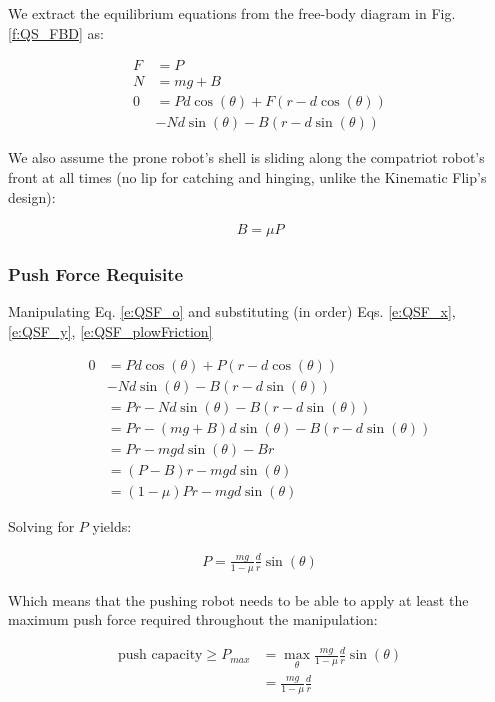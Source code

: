 \documentclass[letterpaper, 10 pt, conference]{ieeeconf}
\begin{document}
We extract the equilibrium equations from the free-body diagram in Fig. \ref{f:QS_FBD} as:

\begin{align}
  F &= P \label{e:QSF_x} \\
  N &= mg + B \label{e:QSF_y} \\
  0 &= P d \cos(\theta) + F(r - d \cos(\theta)) \\
  &   - N d \sin(\theta) - B (r - d \sin(\theta)) \label{e:QSF_o}
\end{align}

We also assume the prone robot's shell is sliding along the compatriot robot's front at all times (no lip for catching and hinging, unlike the Kinematic Flip's design):

\begin{align}
  B = \mu P \label{e:QSF_plowFriction}
\end{align}

\subsubsection{Push Force Requisite}
Manipulating Eq. \ref{e:QSF_o} and substituting (in order) Eqs. \ref{e:QSF_x}, \ref{e:QSF_y}, \ref{e:QSF_plowFriction}

\begin{align}
  0 &= P d \cos(\theta) + P(r - d \cos(\theta))
  \\&   - N d \sin(\theta) - B (r - d \sin(\theta))
  \\&= Pr - N d \sin(\theta) - B (r - d \sin(\theta))
  \\&= Pr - (mg + B) d \sin(\theta) - B (r - d \sin(\theta))
  \\&= Pr - mg d \sin(\theta) - B r
  \\&= (P - B)r - mg d \sin(\theta)
  \\&= (1-\mu) P r - mg d \sin(\theta)
\end{align}

Solving for $P$ yields:

\begin{align}
  P = \frac{mg}{1-\mu} \frac{d}{r} \sin(\theta)
\end{align}

Which means that the pushing robot needs to be able to apply at least the maximum push force required throughout the manipulation:

\begin{align}
  \text{push capacity} \geq P_{max} &= \max_\theta \frac{mg}{1-\mu} \frac{d}{r} \sin(\theta) \\
  &= \frac{mg}{1-\mu} \frac{d}{r}
\end{align}
\end{document}
